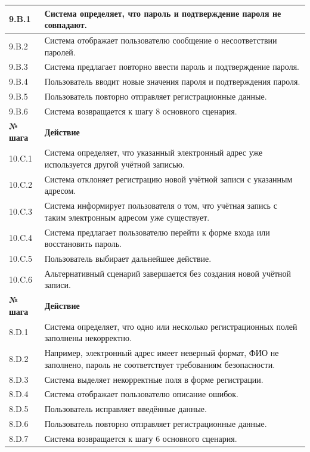 \documentclass[12pt,a4paper]{article}
\begin{document}
\begin{xltabular}{\textwidth}{
			|>{\raggedright\arraybackslash}p{2.7cm}
			|>{\raggedright\arraybackslash}X|
		}
		9.B.1 & Система определяет, что пароль и подтверждение пароля не совпадают. \\
		\hline
		9.B.2 & Система отображает пользователю сообщение о несоответствии паролей. \\
		\hline
		9.B.3 & Система предлагает повторно ввести пароль и подтверждение пароля. \\
		\hline
		9.B.4 & Пользователь вводит новые значения пароля и подтверждения пароля. \\
		\hline
		9.B.5 & Пользователь повторно отправляет регистрационные данные. \\
		\hline
		9.B.6 & Система возвращается к шагу 8 основного сценария. \\
		\hline
		
		
		\textbf{№ шага} & \textbf{Действие} \\
		\hline
		
		10.C.1 & Система определяет, что указанный электронный адрес уже используется
		другой учётной записью. \\
		\hline
		10.C.2 & Система отклоняет регистрацию новой учётной записи с указанным адресом. \\
		\hline
		10.C.3 & Система информирует пользователя о том, что учётная запись с таким
		электронным адресом уже существует. \\
		\hline
		10.C.4 & Система предлагает пользователю перейти к форме входа или восстановить пароль. \\
		\hline
		10.C.5 & Пользователь выбирает дальнейшее действие. \\
		\hline
		10.C.6 & Альтернативный сценарий завершается без создания новой учётной записи. \\
		\hline
		
		
		\textbf{№ шага} & \textbf{Действие} \\
		\hline
		
		8.D.1 & Система определяет, что одно или несколько регистрационных полей
		заполнены некорректно. \\
		\hline
		8.D.2 & Например, электронный адрес имеет неверный формат, ФИО не заполнено,
		пароль не соответствует требованиям безопасности. \\
		\hline
		8.D.3 & Система выделяет некорректные поля в форме регистрации. \\
		\hline
		8.D.4 & Система отображает пользователю описание ошибок. \\
		\hline
		8.D.5 & Пользователь исправляет введённые данные. \\
		\hline
		8.D.6 & Пользователь повторно отправляет регистрационные данные. \\
		\hline
		8.D.7 & Система возвращается к шагу 6 основного сценария. \\
		\hline
		

\end{xltabular}
\end{document}
